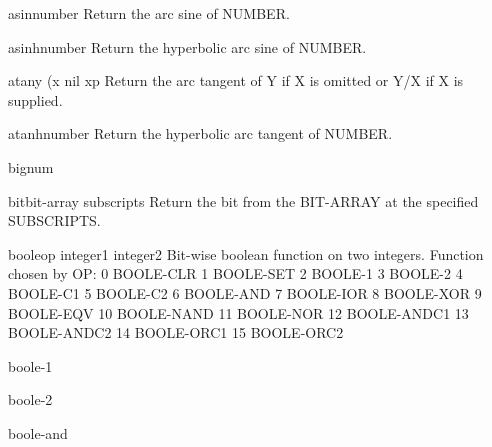 \begin{function}{asin}{number}{}
  Return the arc sine of NUMBER.
\end{function}

\begin{function}{asinh}{number}{}
  Return the hyperbolic arc sine of NUMBER.
\end{function}

\begin{function}{atan}{y \op (x nil xp}{}
  Return the arc tangent of Y if X is omitted or Y/X if X is supplied.
\end{function}

\begin{function}{atanh}{number}{}
  Return the hyperbolic arc tangent of NUMBER.
\end{function}

\begin{type}{bignum}{}{}
  
\end{type}

\begin{type}{bit}{bit-array \rest subscripts}{}
  Return the bit from the BIT-ARRAY at the specified SUBSCRIPTS.
\end{type}

\begin{function}{boole}{op integer1 integer2}{}
  Bit-wise boolean function on two integers. Function chosen by OP:
        0       BOOLE-CLR
        1       BOOLE-SET
        2       BOOLE-1
        3       BOOLE-2
        4       BOOLE-C1
        5       BOOLE-C2
        6       BOOLE-AND
        7       BOOLE-IOR
        8       BOOLE-XOR
        9       BOOLE-EQV
        10      BOOLE-NAND
        11      BOOLE-NOR
        12      BOOLE-ANDC1
        13      BOOLE-ANDC2
        14      BOOLE-ORC1
        15      BOOLE-ORC2
\end{function}

\begin{constant}{boole-1}{}{}
  
\end{constant}

\begin{constant}{boole-2}{}{}
  
\end{constant}

\begin{constant}{boole-and}{}{}
  
\end{constant}

